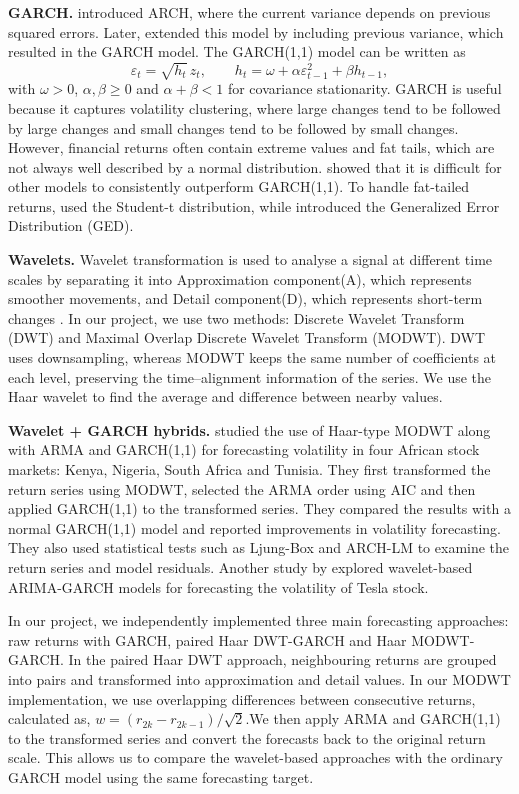 \documentclass{article}
\begin{document}
\textbf{GARCH.} \citet{engle1982} introduced ARCH, where the current variance depends on previous squared errors. Later, \citet{bollerslev1986} extended this model by including previous variance, which resulted in the GARCH model. The GARCH(1,1) model can be written as
\begin{equation}
\varepsilon_t=\sqrt{h_t}\,z_t,\qquad h_t=\omega+\alpha\varepsilon_{t-1}^2+\beta h_{t-1},
\label{eq:garch}
\end{equation}
with $\omega>0$, $\alpha,\beta\ge0$ and $\alpha+\beta<1$ for covariance stationarity. GARCH is useful because it captures volatility clustering, where large changes tend to be followed by large changes and small changes tend to be followed by small changes. However, financial returns often contain extreme values and fat tails, which are not always well described by a normal distribution. \citet{hansen2005} showed that it is difficult for other models to consistently outperform GARCH(1,1). To handle fat-tailed returns, \citet{bollerslev1987} used the Student-t distribution, while \citet{nelson1991} introduced the Generalized Error Distribution (GED).

\textbf{Wavelets.} Wavelet transformation is used to analyse a signal at different time scales by separating it into Approximation component(A), which represents smoother movements, and Detail component(D), which represents short-term changes \citet{mallat1989}. In our project, we use two methods: Discrete Wavelet Transform (DWT) and Maximal Overlap Discrete Wavelet Transform (MODWT). DWT uses downsampling, whereas MODWT keeps the same number of coefficients at each level, preserving the time--alignment information of the series. We use the Haar wavelet to find the average and difference between nearby values.

\textbf{Wavelet + GARCH hybrids.} \citet{ismail2016} studied the use of Haar-type MODWT along with ARMA and GARCH(1,1) for forecasting volatility in four African stock markets: Kenya, Nigeria, South Africa and Tunisia. They first transformed the return series using MODWT, selected the ARMA order using AIC and then applied GARCH(1,1) to the transformed series. They compared the results with a normal GARCH(1,1) model and reported improvements in volatility forecasting. They also used statistical tests such as Ljung-Box and ARCH-LM to examine the return series and model residuals. Another study by  \citet{rubio2023} explored wavelet-based ARIMA-GARCH models for forecasting the volatility of Tesla stock.

In our project, we independently implemented three main forecasting approaches: raw returns with GARCH, paired Haar DWT-GARCH and Haar MODWT-GARCH. In the paired Haar DWT approach, neighbouring returns are grouped into pairs and transformed into approximation and detail values. In our MODWT implementation, we use overlapping differences between consecutive returns, calculated as, $w=(r_{2k}-r_{2k-1})/\sqrt2$.We then apply ARMA and GARCH(1,1) to the transformed series and convert the forecasts back to the original return scale. This allows us to compare the wavelet-based approaches with the ordinary GARCH model using the same forecasting target.
\end{document}
